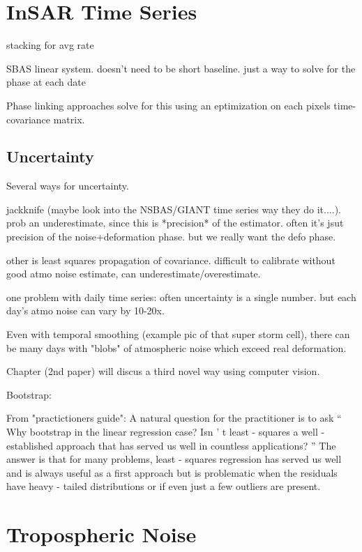 \documentclass{utexasthesis}
\begin{document}
\section{InSAR Time Series}

stacking for avg rate

SBAS linear system. doesn't need to be short baseline. just a way to solve for the phase at each date

Phase linking approaches solve for this using an eptimization on each pixels time-covariance matrix.

\subsection{Uncertainty}

Several ways for uncertainty.

jackknife (maybe look into the NSBAS/GIANT time series way they do it....). prob an underestimate, since this is *precision* of the estimator. often it's jsut precision of the noise+deformation phase. but we really want the defo phase.

other is least squares propagation of covariance. difficult to calibrate without good atmo noise estimate, can underestimate/overestimate.

one problem with daily time series: often uncertainty is a single number. but each day's atmo noise can vary by 10-20x.

Even with temporal smoothing (example pic of that super storm cell), there can be many days with "blobs" of atmospheric noise which exceed real deformation.

Chapter (2nd paper) will discus a third novel way using computer vision.


Bootstrap:

From "practictioners guide":
A natural question for the practitioner is to ask  “ Why bootstrap in the linear regression case? Isn ’ t least - squares a well - established approach that  has  served  us  well  in  countless  applications? ”   The  answer  is  that  for  many  problems, least - squares regression has served us well and is always useful as  a first approach but is problematic when the residuals have heavy - tailed distributions or if even just a few outliers are present.



\section{Tropospheric Noise}
\end{document}

